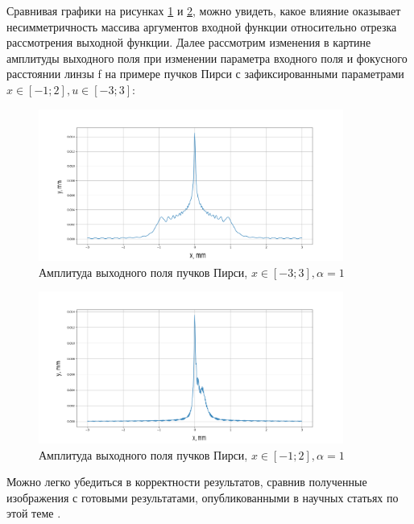 {			Сравнивая графики на рисунках \ref{pearceyoutput} и \ref{pearceyoutput1}, можно увидеть, какое влияние
оказывает несимметричность массива аргументов входной функции
относительно отрезка рассмотрения выходной функции.
Далее рассмотрим изменения в картине амплитуды выходного поля при
изменении параметра входного поля и фокусного расстоянии линзы f на
примере пучков Пирси с зафиксированными параметрами $x \in [-1; 2], u \in [-3; 3]:$

 \begin{figure}[H]
		  \begin{center}
			\includegraphics[width=10cm]{plots/pearceyoutput}
	\caption{Амплитуда выходного поля пучков Пирси, $x \in [-3; 3], \alpha  = 1$}
	\label{pearceyoutput}
		 \end{center}
	
\end{figure}

\begin{figure}[H]
		  \begin{center}
			\includegraphics[width=10cm]{plots/pearceyoutput1}
	\caption{Амплитуда выходного поля пучков Пирси, $x \in [-1; 2], \alpha  = 1$}
	\label{pearceyoutput1}
		 \end{center}
	
\end{figure}
			

	Можно легко убедиться в корректности результатов, сравнив полученные
изображения с готовыми результатами, опубликованными в научных статьях по
этой теме \cite{airy_acc}.

}

